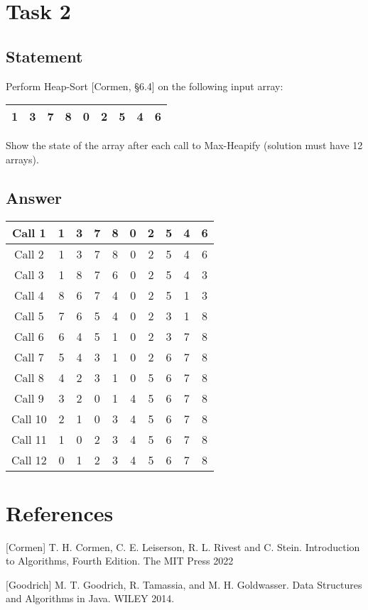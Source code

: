 \documentclass{article}
\begin{document}
\section{Task 2}
\subsection{Statement}
Perform Heap-Sort [Cormen, §6.4] on the following input array:

\begin{table}[!h]
    \centering
    \begin{tabular}{|c|c|c|c|c|c|c|c|c|}
        \hline
        1 & 3 & 7 & 8 & 0 & 2 & 5 & 4 & 6 \\
        \hline
    \end{tabular}
\end{table}

Show the state of the array after each call to Max-Heapify (solution must have 12 arrays).

\subsection{Answer}

\begin{table}[!h]
    \centering
    \begin{tabular}{|c||c|c|c|c|c|c|c|c|c|}
        \hline
        Call 1 & 1 & 3 & 7 & 8 & 0 & 2 & 5 & 4 & 6 \\
        \hline
        Call 2 & 1 & 3 & 7 & 8 & 0 & 2 & 5 & 4 & 6 \\
        \hline
        Call 3 & 1 & 8 & 7 & 6 & 0 & 2 & 5 & 4 & 3 \\
        \hline
        Call 4 & 8 & 6 & 7 & 4 & 0 & 2 & 5 & 1 & 3 \\
        \hline
        Call 5 & 7 & 6 & 5 & 4 & 0 & 2 & 3 & 1 & 8 \\
        \hline
        Call 6 & 6 & 4 & 5 & 1 & 0 & 2 & 3 & 7 & 8 \\
        \hline
        Call 7 & 5 & 4 & 3 & 1 & 0 & 2 & 6 & 7 & 8 \\
        \hline
        Call 8 & 4 & 2 & 3 & 1 & 0 & 5 & 6 & 7 & 8 \\
        \hline
        Call 9 & 3 & 2 & 0 & 1 & 4 & 5 & 6 & 7 & 8 \\
        \hline
        Call 10 & 2 & 1 & 0 & 3 & 4 & 5 & 6 & 7 & 8 \\
        \hline
        Call 11 & 1 & 0 & 2 & 3 & 4 & 5 & 6 & 7 & 8 \\
        \hline
        Call 12 & 0 & 1 & 2 & 3 & 4 & 5 & 6 & 7 & 8 \\
        \hline
    \end{tabular}
\end{table}

\section*{References}
[Cormen] T. H. Cormen, C. E. Leiserson, R. L. Rivest and C. Stein. Introduction to Algorithms, Fourth Edition. The MIT Press 2022

[Goodrich] M. T. Goodrich, R. Tamassia, and M. H. Goldwasser. Data Structures and Algorithms in Java. WILEY 2014.
\end{document}
